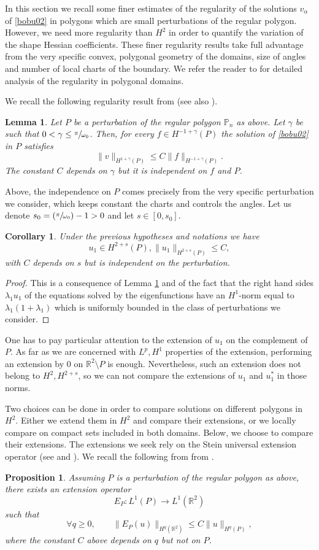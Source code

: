 \documentclass[11pt]{article}
\numberwithin{equation}{section}\newtheorem*{jepEnonce}{\jepEnonceTitle}\newenvironment{enonce*}[1]{\def\jepEnonceTitle{#1}\jepEnonce}{\endjepEnonce}\newtheorem*{conj*}{Conjecture}
\newcommand{\Psfrac}[2]{(\sfrac{#1}{#2})}
\theoremstyle{plain}
\newtheorem{lemma}[thm]{Lemma}
\newtheorem{cor}[thm]{Corollary}
\newtheorem{propo}[thm]{Proposition}
\theoremstyle{definition}
\let\Bbb\mathbb
\def\R{\mathbb{R}}
\newcommand{\lb}{\lambda}
\newcommand{\sm}{\setminus}
\let\jepOriginalSfrac\sfrac
\renewcommand{\sfrac}[2]{{\jepOriginalSfrac{#1}{#2}}}
\begin{document}
In this section we recall some finer estimates of the regularity of the solutions $v_\alpha$ of \eqref{bobu02} in polygons which are small perturbations of the regular polygon. However, we need more regularity than $H^2$ in order to quantify the variation of the shape Hessian coefficients. These finer regularity results take full advantage from the very specific convex, polygonal geometry of the domains, size of angles and number of local charts of the boundary. We refer the reader to \cite{Da88} for detailed analysis of the regularity in polygonal domains.

We recall the following regularity result from \cite[Th.\,9.8]{BDLN92} (see also \cite{Da88}).
\begin{lemma}\label{bobu12}
Let $P$ be a perturbation of the regular polygon $\Bbb{P}_n$ as above. Let $\gamma$ be such that $0<\gamma\le \sfrac {\pi}{\omega_{0}}$. Then, for every $f \in H^{-1+ \gamma } (P)$ the solution of \eqref{bobu02} in $P$ satisfies
\[
\|v\|_{H^{1+\gamma}(P)} \le C \|f\|_{H^{-1+\gamma} (P)}.
\]
The constant $C$ depends on $\gamma$ but it is independent on $f$ and $P$.
\end{lemma}
Above, the independence on $P$ comes precisely from the very specific perturbation we consider, which keeps constant the charts and controls the angles. Let us denote $s_0 = \Psfrac {\pi}{\omega_{0}} - 1>0$ and let $s\in[0,s_0]$.
\begin{cor}
Under the previous hypotheses and notations we have
\[
u_1\in H^{2+s} (P), \|u_1\|_{H^{2+s} (P)} \le C,
\]
with $C$ depends on $s$ but is independent on the perturbation.
\end{cor}
\begin{proof}
This is a consequence of Lemma \ref{bobu12} and of the fact that the right hand sides $\lb_1 u_1$ of the equations solved by the eigenfunctions have an $H^1$-norm equal to $\lb_1 (1+ \lb_1)$ which is uniformly bounded in the class of perturbations we consider.
\end{proof}

One has to pay particular attention to the extension of $u_1$ on the complement of~$P$. As far as we are concerned with $L^p, H^1$ properties of the extension, performing an extension by $0$ on $\R^2\sm P$ is enough. Nevertheless, such an extension does not belong to $H^2, H^{2+s}$, so we can not compare the extensions of $u_1$ and $u_1^*$ in those norms.

Two choices can be done in order to compare solutions on different polygons in $H^2$. Either we extend them in $H^2$ and compare their extensions, or we locally compare on compact sets included in both domains. Below, we choose to compare their extensions. The extensions we seek rely on the Stein universal extension operator (see \cite{St70} and \cite{LaVi19,HLZ12}). We recall the following from from \cite{ St70}.
\begin{propo} \label{bobu13}
Assuming $P$ is a perturbation of the regular polygon as above, there exists an extension operator
\[
E_P: L^1(P) \to L^1(\R^2)
\]
such that
\[
\forall q \ge 0, \qquad \| E_P(u) \|_{H^q (\R^2)} \le C\| u\|_{H^q(P)},
\]
where the constant $C$ above depends on $q$ but not on $P$.
\end{propo}
\end{document}
